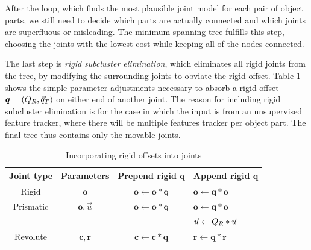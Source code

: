\documentclass[letterpaper, 10 pt, conference]{ieeeconf}  %
\def\xmat{\uppercase}    \def\xmatstr{in uppercase}
\def\xvec{\vec}          \def\xvecstr{with an arrow}
\def\xse{\bm}            \def\xsestr{in boldface}
\begin{document}
After the loop, which finds the most plausible joint model for each pair of object parts, we still need to decide which parts are actually connected and which joints are superfluous or misleading. The minimum spanning tree fulfills this step, choosing the joints with the lowest cost while keeping all of the nodes connected.

The last step is \emph{rigid subcluster elimination}, which eliminates all rigid joints from the tree, by modifying the surrounding joints to obviate the rigid offset. Table \ref{tbl:move} shows the simple parameter adjustments necessary to absorb a rigid offset $\xse{q} = (\xmat{q}_R, \xvec{q}_T)$ on either end of another joint. The reason for including rigid subcluster elimination is for the case in which the input is from an unsupervised feature tracker, where there will be multiple features tracker per object part. The final tree thus contains only the movable joints.

\begin{table}[ht]
  \begin{tabular}{c|c|c|l}
    Joint type & Parameters & Prepend rigid $\xse{q}$ & Append rigid $\xse{q}$ \\
    \hline
    Rigid & $\xse{o}$ & $\xse{o} \leftarrow \xse{o}*\xse{q}$ & $\xse{o} \leftarrow \xse{q}*\xse{o}$ \\
    Prismatic & $\xse{o}, \xvec{u}$ & $\xse{o} \leftarrow \xse{o}*\xse{q}$ & $\xse{o} \leftarrow \xse{q}*\xse{o}$ \\&&& $\xvec{u} \leftarrow \xmat{q}_R*\xvec{u}$ \\
    Revolute & $\xse{c}, \xse{r}$ & $\xse{c} \leftarrow \xse{c}*\xse{q}$ & $\xse{r} \leftarrow \xse{q}*\xse{r}$ \\
  \end{tabular}
  \caption{Incorporating rigid offsets into joints}
  \label{tbl:move}
\end{table}
\end{document}
